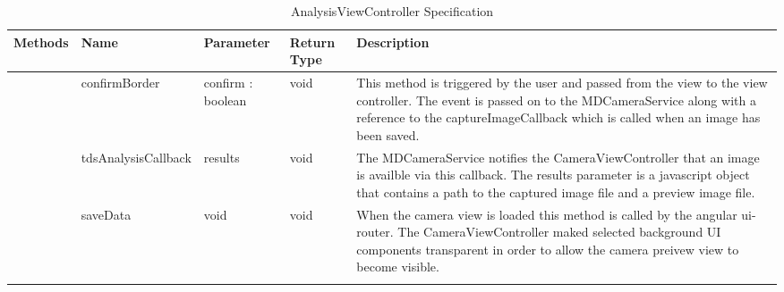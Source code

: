 {\begin{longtable}[H]{  | >{\bfseries}l | p{1.5cm} | p{1.5cm} | p{1.5cm} | p{4cm} | }
    Methods
    & Name & Parameter & Return Type & Description \\ \hline

        & confirmBorder & confirm : boolean & void
        & This method is triggered by the user and passed from the view to the view controller. The event is passed on to the MDCameraService along with a reference to the captureImageCallback which is called when an image has been saved.
        \\ \hline
        & tdsAnalysisCallback & results & void
        & The MDCameraService notifies the CameraViewController that an image is availble via this callback. The results parameter is a javascript object that contains a path to the captured image file and a preview image file.
        \\ \hline
        & saveData & void & void
        & When the camera view is loaded this method is called by the angular ui-router. The CameraViewController maked selected background UI components transparent in order to allow the camera preivew view to become visible.
        \\ \hline


    \caption{AnalysisViewController Specification}
    \label{fig:analysis_controller}
\end{longtable}
}